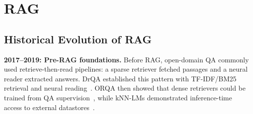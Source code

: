

\section{RAG}

\subsection{Historical Evolution of RAG}

\textbf{2017--2019: Pre-RAG foundations.}
Before RAG, open-domain QA commonly used retrieve-then-read pipelines: a sparse retriever fetched passages and a neural reader extracted answers. DrQA established this pattern with TF-IDF/BM25 retrieval and neural reading~\cite{chen2017drqa}. ORQA then showed that dense retrievers could be trained from QA supervision~\cite{orqa2019}, while kNN-LMs demonstrated inference-time access to external datastores~\cite{khandelwal2020knnlm}.

